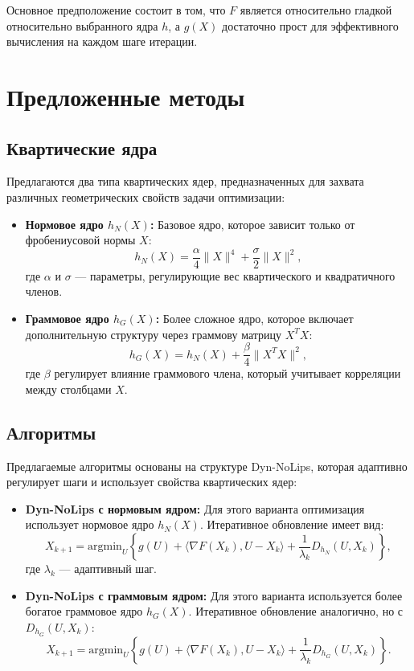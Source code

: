 \documentclass[a4paper,11pt]{article}
\begin{document}
Основное предположение состоит в том, что \(F\) является относительно гладкой относительно выбранного ядра \(h\), а \(g(X)\) достаточно прост для эффективного вычисления на каждом шаге итерации.

\section{Предложенные методы}
\subsection{Квартические ядра}
Предлагаются два типа квартических ядер, предназначенных для захвата различных геометрических свойств задачи оптимизации:
\begin{itemize}
    \item \textbf{Нормовое ядро \(h_N(X)\):} Базовое ядро, которое зависит только от фробениусовой нормы \(X\):
    \[
    h_N(X) = \frac{\alpha}{4}\|X\|^4 + \frac{\sigma}{2}\|X\|^2,
    \]
    где \(\alpha\) и \(\sigma\) — параметры, регулирующие вес квартического и квадратичного членов.
    \item \textbf{Граммовое ядро \(h_G(X)\):} Более сложное ядро, которое включает дополнительную структуру через граммову матрицу \(X^TX\):
    \[
    h_G(X) = h_N(X) + \frac{\beta}{4}\|X^TX\|^2,
    \]
    где \(\beta\) регулирует влияние граммового члена, который учитывает корреляции между столбцами \(X\).
\end{itemize}

\subsection{Алгоритмы}
Предлагаемые алгоритмы основаны на структуре Dyn-NoLips, которая адаптивно регулирует шаги и использует свойства квартических ядер:
\begin{itemize}
    \item \textbf{Dyn-NoLips с нормовым ядром:}
    Для этого варианта оптимизация использует нормовое ядро \(h_N(X)\). Итеративное обновление имеет вид:
    \[
    X_{k+1} = \text{argmin}_U \left\{ g(U) + \langle \nabla F(X_k), U - X_k \rangle + \frac{1}{\lambda_k} D_{h_N}(U, X_k) \right\},
    \]
    где \(\lambda_k\) — адаптивный шаг.
    \item \textbf{Dyn-NoLips с граммовым ядром:}
    Для этого варианта используется более богатое граммовое ядро \(h_G(X)\). Итеративное обновление аналогично, но с \(D_{h_G}(U, X_k)\):
    \[
    X_{k+1} = \text{argmin}_U \left\{ g(U) + \langle \nabla F(X_k), U - X_k \rangle + \frac{1}{\lambda_k} D_{h_G}(U, X_k) \right\}.
    \]
\end{itemize}
\end{document}
